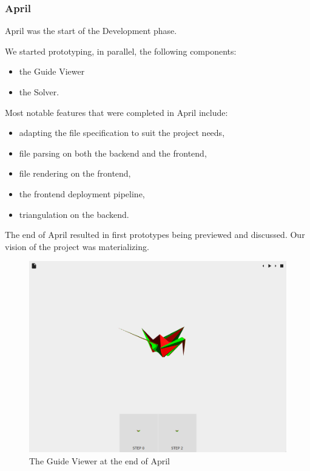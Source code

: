 \subsubsection{April}

April was the start of the Development phase.

We started prototyping, in parallel, the following components:
\begin{itemize}
	\item the Guide Viewer
	\item the Solver.
\end{itemize}

Most notable features that were completed in April include:
\begin{itemize}
	\item adapting the  file specification to suit the project needs,
	\item {} file parsing on both the backend and the frontend,
	\item {} file rendering on the frontend,
	\item the frontend deployment pipeline,
	\item triangulation on the backend.
\end{itemize}
The end of April resulted in first prototypes being previewed and discussed. Our vision of the project was materializing.

\begin{figure}[H]
	\label{04-first-prototypes}
	\caption{The Guide Viewer at the end of April}
  \centering
    \includegraphics[width=1.01\textwidth]{assets/prototype-front.png}
\end{figure}


